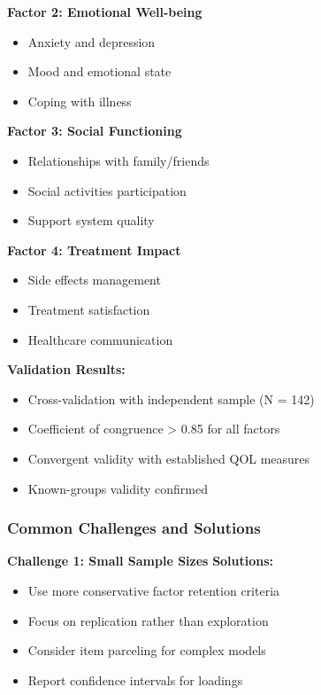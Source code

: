 \documentclass[
]{article}
\begin{document}
\textbf{Factor 2: Emotional Well-being}

\begin{itemize}
\item
  Anxiety and depression
\item
  Mood and emotional state
\item
  Coping with illness
\end{itemize}

\textbf{Factor 3: Social Functioning}

\begin{itemize}
\item
  Relationships with family/friends
\item
  Social activities participation
\item
  Support system quality
\end{itemize}

\textbf{Factor 4: Treatment Impact}

\begin{itemize}
\item
  Side effects management
\item
  Treatment satisfaction
\item
  Healthcare communication
\end{itemize}

\textbf{Validation Results:}

\begin{itemize}
\item
  Cross-validation with independent sample (N = 142)
\item
  Coefficient of congruence \textgreater{} 0.85 for all factors
\item
  Convergent validity with established QOL measures
\item
  Known-groups validity confirmed
\end{itemize}

\subsubsection{Common Challenges and Solutions}

\textbf{Challenge 1: Small Sample Sizes} \textbf{Solutions:}

\begin{itemize}
\item
  Use more conservative factor retention criteria
\item
  Focus on replication rather than exploration
\item
  Consider item parceling for complex models
\item
  Report confidence intervals for loadings
\end{itemize}
\end{document}
